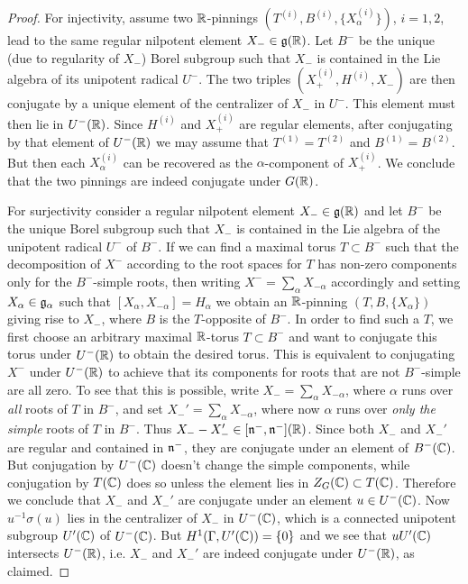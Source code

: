 \documentclass{article}
\theoremstyle{definition}
\numberwithin{equation}{section}
\renewcommand{\-}{\hyp{}}
\begin{document}
\begin{proof}
For injectivity, assume two $\mathbb{R}$-pinnings $(T^{(i)},B^{(i)},\{X_\alpha^{(i)}\})$, $i=1,2$, lead to the same regular nilpotent element $X_- \in \mathfrak{g}(\mathbb{R})$. Let $B^-$ be the unique (due to regularity of $X_-$) Borel subgroup such that $X_-$ is contained in the Lie algebra of its unipotent radical $U^-$. The two triples $(X_+^{(i)},H^{(i)},X_-)$ are then conjugate by a unique element of the centralizer of $X_-$ in $U^-$. This element must then lie in $U^-(\mathbb{R})$. Since $H^{(i)}$ and $X_+^{(i)}$ are regular elements, after conjugating by that element of $U^-(\mathbb{R})$ we may assume that $T^{(1)}=T^{(2)}$ and $B^{(1)}=B^{(2)}$. But then each $X_\alpha^{(i)}$ can be recovered as the $\alpha$-component of $X_+^{(i)}$. We conclude that the two pinnings are indeed conjugate under $G(\mathbb{R})$.

For surjectivity consider a regular nilpotent element $X_- \in \mathfrak{g}(\mathbb{R})$ and let $B^-$ be the unique Borel subgroup such that $X_-$ is contained in the Lie algebra of the unipotent radical $U^-$ of $B^-$. If we can find a maximal torus $T \subset B^-$ such that the decomposition of $X^-$ according to the root spaces for $T$ has non-zero components only for the $B^-$-simple roots, then writing $X^-=\sum_\alpha X_{-\alpha}$ accordingly and setting $X_\alpha \in \mathfrak{g}_\alpha$ such that $[X_\alpha,X_{-\alpha}]=H_\alpha$ we obtain an $\mathbb{R}$-pinning $(T,B,\{X_\alpha\})$ giving rise to $X_-$, where $B$ is the $T$-opposite of $B^-$. In order to find such a $T$, we first choose an arbitrary maximal $\mathbb{R}$-torus $T \subset B^-$ and want to conjugate this torus under $U^-(\mathbb{R})$ to obtain the desired torus. This is equivalent to conjugating $X^-$ under $U^-(\mathbb{R})$ to achieve that its components for roots that are not $B^-$-simple are all zero. To see that this is possible, write $X_-=\sum_\alpha X_{-\alpha}$, where $\alpha$ runs over \emph{all} roots of $T$ in $B^-$, and set $X_-'=\sum_\alpha X_{-\alpha}$, where now $\alpha$ runs over \emph{only the simple} roots of $T$ in $B^-$. Thus $X_--X_-' \in [\mathfrak{n}^-,\mathfrak{n}^-](\mathbb{R})$. Since both $X_-$ and $X_-'$ are regular and contained in $\mathfrak{n}^-$, they are conjugate under an element of $B^-(\mathbb{C})$. But conjugation by $U^-(\mathbb{C})$ doesn't change the simple components, while conjugation by $T(\mathbb{C})$ does so unless the element lies in $Z_G(\mathbb{C}) \subset T(\mathbb{C})$. Therefore we conclude that $X_-$ and $X_-'$ are conjugate under  an element $u \in U^-(\mathbb{C})$. Now $u^{-1}\sigma(u)$ lies in the centralizer of $X_-$ in $U^-(\mathbb{C})$, which is a connected unipotent subgroup $U'(\mathbb{C})$ of $U^-(\mathbb{C})$. But $H^1(\Gamma,U'(\mathbb{C}))=\{0\}$ and we see that $uU'(\mathbb{C})$ intersects $U^-(\mathbb{R})$, i.e. $X_-$ and $X_-'$ are indeed conjugate under $U^-(\mathbb{R})$, as claimed.
\end{proof}
\end{document}
